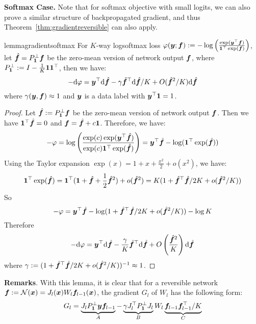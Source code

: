 \textbf{Softmax Case.} Note that for softmax objective with small logits, we can also prove a similar structure of backpropagated gradient, and thus Theorem~\ref{thm:gradientreversible} can also apply.
\begin{restatable}{lemma}{gradientsoftmax}
For $K$-way logsoftmax loss $\varphi({\bm{y}}; {\bm{f}}) := -\log \left( \frac{\exp({\bm{y}}^\top {\bm{f}})}{{\bm{1}}^\top \exp({\bm{f}})}\right)$, let $\hat{{\bm{f}}} = P^\perp_{\bm{1}} {\bm{f}}$ be the zero-mean version of network output ${\bm{f}}$, where $P^\perp_{\bm{1}} := I - \frac{1}{K}{\bm{1}}{\bm{1}}^\top$, then we have:
\begin{equation}
   -\mathrm{d} \varphi = {\bm{y}}^\top \mathrm{d}\hat{{\bm{f}}} - \gamma \hat{{\bm{f}}}^\top \mathrm{d}\hat{{\bm{f}}}/K + O(\hat{{\bm{f}}}^2/K)\mathrm{d}\hat{{\bm{f}}}  
\end{equation}
where $\gamma({\bm{y}},{\bm{f}}) \approx 1$ and ${\bm{y}}$ is a data label with ${\bm{y}}^\top {\bm{1}} = 1$.
\end{restatable}
\begin{proof}
Let $\hat{{\bm{f}}} := P^\perp_{\bm{1}} {\bm{f}}$ be the zero-mean version of network output ${\bm{f}}$. Then we have ${\bm{1}}^\top\hat{{\bm{f}}} = 0$ and ${\bm{f}} = \hat{{\bm{f}}} + c{\bm{1}}$. Therefore, we have: 
\begin{equation}
    -\varphi = \log \left( \frac{\exp(c)\exp({\bm{y}}^\top \hat{{\bm{f}}})}{\exp(c){\bm{1}}^\top \exp(\hat{{\bm{f}}})}\right) = {\bm{y}}^\top\hat{{\bm{f}}} - \log({\bm{1}}^\top \exp(\hat{{\bm{f}}}))
\end{equation}
Using the Taylor expansion $\exp(x) = 1 + x + \frac{x^2}{2} + o(x^2)$, we have: 
\begin{equation}
    {\bm{1}}^\top \exp(\hat{{\bm{f}}}) = {\bm{1}}^\top({\bm{1}} + \hat{{\bm{f}}} + \frac12\hat{{\bm{f}}}^2) + o(\hat{{\bm{f}}}^2) = K (1 + \hat{{\bm{f}}}^\top\hat{{\bm{f}}}/2K + o(\hat{{\bm{f}}}^2/K))
\end{equation}
So
\begin{equation}
    -\varphi = {\bm{y}}^\top\hat{{\bm{f}}} - \log(1 + \hat{{\bm{f}}}^\top\hat{{\bm{f}}}/2K + o(\hat{{\bm{f}}}^2/K)) - \log K  
\end{equation}
Therefore
\begin{equation}
    -\mathrm{d} \varphi = {\bm{y}}^\top\mathrm{d} \hat{{\bm{f}}} - \frac{\gamma}{K} \hat{{\bm{f}}}^\top\mathrm{d}\hat{{\bm{f}}} + O\left(\frac{\hat{{\bm{f}}}^2}{K}\right)\mathrm{d}\hat{{\bm{f}}}
\end{equation}
where $\gamma := (1 + \hat{{\bm{f}}}^\top\hat{{\bm{f}}}/2K + o(\hat{{\bm{f}}}^2/K))^{-1} \approx 1$. 
\end{proof}
\textbf{Remarks}. With this lemma, it is clear that for a reversible network ${\bm{f}} := \mathcal{N}({\bm{x}}) = J_l({\bm{x}}) W_l{\bm{f}}_{l-1}({\bm{x}})$, the gradient $G_l$ of $W_l$ has the following form:
\begin{equation}
    G_l = \underbrace{J_lP^\perp_{\bm{1}} {\bm{y}} {\bm{f}}_{l-1}}_A - \underbrace{\gamma J_l^\top P^\perp_{\bm{1}} J_l}_B W_l \underbrace{{\bm{f}}_{l-1}{\bm{f}}_{l-1}^\top / K}_C
\end{equation}

